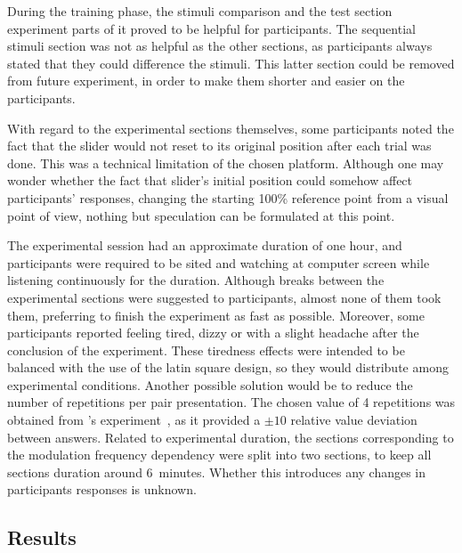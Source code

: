 \documentclass[../main.tex]{subfiles}
\begin{document}
During the training phase, the stimuli comparison and the test section
experiment parts of it proved to be helpful for participants. The sequential
stimuli section was not as helpful as the other sections, as participants
always stated that they could difference the stimuli. This latter section
could be removed from future experiment, in order to make them shorter and
easier on the participants.

With regard to the experimental sections themselves, some participants noted
the fact that the slider would not reset to its original position after each
trial was done. This was a technical limitation of the chosen platform. Although
one may wonder whether the fact that slider's initial position could somehow
affect participants' responses, changing the starting 100\% reference point from
a visual point of view, nothing but speculation can be formulated at this point.

The experimental session had an approximate duration of one hour, and
participants were required to be sited and watching at computer screen while
listening continuously for the duration. Although breaks between the
experimental sections were suggested to participants, almost none of them took
them, preferring to finish the experiment as fast as possible. Moreover, some
participants reported feeling tired, dizzy or with a slight headache after the
conclusion of the experiment. These tiredness effects were intended to be
balanced with the use of the latin square design, so they would distribute among
experimental conditions. Another possible solution would be to reduce the number
of repetitions per pair presentation. The chosen value of 4 repetitions was
obtained from \citeauthor{Fastl1982Fluctuation}'s
experiment~\cite{Fastl1982Fluctuation}, as it provided a $\pm10$ relative value
deviation between answers. Related to experimental duration, the sections
corresponding to the modulation frequency dependency were split into two
sections, to keep all sections duration around 6~minutes. Whether this
introduces any changes in participants responses is unknown.

\subsection{Results}
\end{document}

